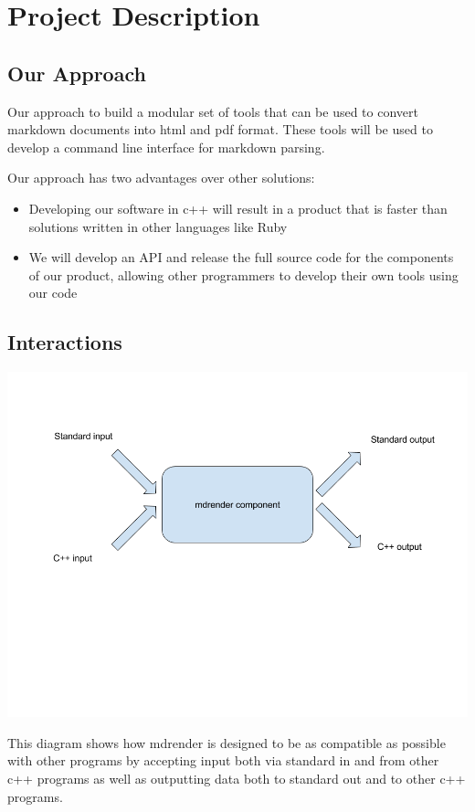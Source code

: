 \section{Project Description}

\subsection{Our Approach}
Our approach to build a modular set of tools that can be used to convert markdown documents into html and pdf format. These tools will be used to develop a command line interface for markdown parsing.

Our approach has two advantages over other solutions:
\begin{itemize}
	\item Developing our software in c++ will result in a product that is faster than solutions written in other languages like Ruby
	\item We will develop an API and release the full source code for the components of our product, allowing other programmers to develop their own tools using our code
\end{itemize}

\subsection{Interactions}

\includegraphics[width=500pt]{images/mdrender_interactions.png}

This diagram shows how mdrender is designed to be as compatible as possible with other programs by accepting input both via standard in and from other c++ programs as well as outputting data both to standard out and to other c++ programs.

